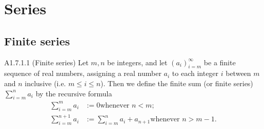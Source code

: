 \section{Series}
\subsection{Finite series}
\begin{definition}{A1.7.1.1}
    (Finite series) Let $m, n$ be integers, and let $(a_i)_{i=m}^{\infty}$ be a
    finite sequence of real numbers, assigning a real number $a_i$ to each
    integer $i$ between $m$ and $n$ inclusive (i.e. $m \leq i \leq n$). Then
    we define the finite sum (or finite series) $\sum_{i=m}^{n} a_i$ by the
    recursive formula
    \begin{align*}
        \sum_{i=m}^{m} a_i &:= 0 \text{whenever $n < m$;} \\
        \sum_{i=m}^{n+1} a_i &:= \sum_{i=m}^{n} a_i + a_{n+1} \text{whenever $n > m - 1$.}
    \end{align*}
\end{definition}

